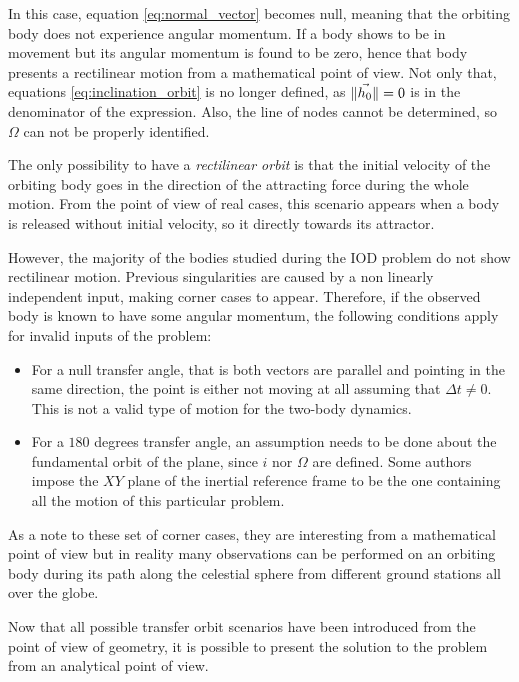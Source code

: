 In this case, equation \ref{eq:normal_vector} becomes null, meaning that the
orbiting body does not experience angular momentum. If a body shows to be in
movement but its angular momentum is found to be zero, hence that body presents
a rectilinear motion from a mathematical point of view. Not only that, equations
\ref{eq:inclination_orbit} is no longer defined, as $\lVert\vec{h_{0}}\rVert=0$ is in
the denominator of the expression. Also, the line of nodes cannot be determined,
so $\Omega$ can not be properly identified.

The only possibility to have a \textit{rectilinear orbit} is that the initial
velocity of the orbiting body goes in the direction of the attracting force
during the whole motion. From the point of view of real cases, this scenario
appears when a body is released without initial velocity, so it directly towards
its attractor.

However, the majority of the bodies studied during the IOD problem do not show
rectilinear motion. Previous singularities are caused by a non linearly
independent input, making corner cases to appear. Therefore, if the observed
body is known to have some angular momentum, the following conditions apply for
invalid inputs of the problem:

\begin{itemize}
\item For a null transfer angle, that is both vectors are parallel and pointing
      in the same direction, the point is either not moving at all assuming that
      $\Delta t \neq 0$. This is not a valid type of motion for the two-body
      dynamics.
\item For a $180$ degrees transfer angle, an assumption needs to be done about
	the fundamental orbit of the plane, since $i$ nor $\Omega$ are defined.
	Some authors impose the $XY$ plane of the inertial reference frame to be
	the one containing all the motion of this particular problem.
\end{itemize}

As a note to these set of corner cases, they are interesting from a mathematical
point of view but in reality many observations can be performed on an orbiting
body during its path along the celestial sphere from different ground stations
all over the globe.

Now that all possible transfer orbit scenarios have been introduced from the
point of view of geometry, it is possible to present the solution to the problem
from an analytical point of view.

